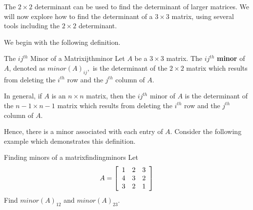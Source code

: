 The $2 \times 2$ determinant can be used to find the determinant of larger matrices.
We will now explore how to find the determinant of a $3 \times 3$ matrix, using several tools
including the $2 \times 2$ determinant.

We begin with the following definition. 

\begin{definition}{The $ij^{th}$ Minor of a Matrix}{ijthminor}
Let $A$ be a $3\times 3$ matrix. The $ij^{th}$ \textbf{minor} of $A$, denoted as $minor\left( A\right) _{ij},$ is the determinant
of the $2\times 2$ matrix which results from deleting the $i^{th}$ row and
the $j^{th}$ column of $A$.

In general, if $A$ is an $n\times n$ matrix, then the $ij^{th}$ minor of $A$ is the determinant of the $n-1 \times n-1$ matrix which results from deleting the $i^{th}$ row and the $j^{th}$ column of $A$. 
\end{definition}

Hence, there is a minor associated with each entry of $A$. Consider the following example which demonstrates this definition. 

\begin{example}{Finding minors of a matrix}{findingminors}
Let 
\begin{equation*}
A = \left[
\begin{array}{rrr}
1 & 2 & 3 \\
4 & 3 & 2 \\
3 & 2 & 1
\end{array}
\right] 
\end{equation*}
Find $minor\left( A\right) _{12}$ and $minor\left( A\right) _{23}$.
\end{example}

